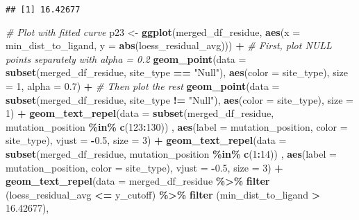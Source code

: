 \documentclass[
]{article}
\newenvironment{Shaded}{\begin{snugshade}}{\end{snugshade}}
\newcommand{\AttributeTok}[1]{\textcolor[rgb]{0.13,0.29,0.53}{#1}}
\newcommand{\CommentTok}[1]{\textcolor[rgb]{0.56,0.35,0.01}{\textit{#1}}}
\newcommand{\DecValTok}[1]{\textcolor[rgb]{0.00,0.00,0.81}{#1}}
\newcommand{\FloatTok}[1]{\textcolor[rgb]{0.00,0.00,0.81}{#1}}
\newcommand{\FunctionTok}[1]{\textcolor[rgb]{0.13,0.29,0.53}{\textbf{#1}}}
\newcommand{\NormalTok}[1]{#1}
\newcommand{\OtherTok}[1]{\textcolor[rgb]{0.56,0.35,0.01}{#1}}
\newcommand{\SpecialCharTok}[1]{\textcolor[rgb]{0.81,0.36,0.00}{\textbf{#1}}}
\newcommand{\StringTok}[1]{\textcolor[rgb]{0.31,0.60,0.02}{#1}}
\begin{document}
\begin{verbatim}
## [1] 16.42677
\end{verbatim}

\begin{Shaded}
\begin{Highlighting}[]
\CommentTok{\# Plot with fitted curve}
\NormalTok{p23 }\OtherTok{\textless{}{-}} \FunctionTok{ggplot}\NormalTok{(merged\_df\_residue, }\FunctionTok{aes}\NormalTok{(}\AttributeTok{x =}\NormalTok{ min\_dist\_to\_ligand, }\AttributeTok{y =} \FunctionTok{abs}\NormalTok{(loess\_residual\_avg))) }\SpecialCharTok{+}
  \CommentTok{\# First, plot NULL points separately with alpha = 0.2}
  \FunctionTok{geom\_point}\NormalTok{(}\AttributeTok{data =} \FunctionTok{subset}\NormalTok{(merged\_df\_residue, site\_type }\SpecialCharTok{==} \StringTok{"Null"}\NormalTok{),}
             \FunctionTok{aes}\NormalTok{(}\AttributeTok{color =}\NormalTok{ site\_type), }\AttributeTok{size =} \DecValTok{1}\NormalTok{, }\AttributeTok{alpha =} \FloatTok{0.7}\NormalTok{) }\SpecialCharTok{+}
  \CommentTok{\# Then plot the rest}
  \FunctionTok{geom\_point}\NormalTok{(}\AttributeTok{data =} \FunctionTok{subset}\NormalTok{(merged\_df\_residue, site\_type }\SpecialCharTok{!=} \StringTok{"Null"}\NormalTok{),}
             \FunctionTok{aes}\NormalTok{(}\AttributeTok{color =}\NormalTok{ site\_type), }\AttributeTok{size =} \DecValTok{1}\NormalTok{) }\SpecialCharTok{+}
  \FunctionTok{geom\_text\_repel}\NormalTok{(}\AttributeTok{data =} \FunctionTok{subset}\NormalTok{(merged\_df\_residue, mutation\_position }\SpecialCharTok{\%in\%} \FunctionTok{c}\NormalTok{(}\DecValTok{123}\SpecialCharTok{:}\DecValTok{130}\NormalTok{)) ,}
                  \FunctionTok{aes}\NormalTok{(}\AttributeTok{label =}\NormalTok{ mutation\_position, }\AttributeTok{color =}\NormalTok{ site\_type), }\AttributeTok{vjust =} \SpecialCharTok{{-}}\FloatTok{0.5}\NormalTok{, }\AttributeTok{size =} \DecValTok{3}\NormalTok{) }\SpecialCharTok{+}
    \FunctionTok{geom\_text\_repel}\NormalTok{(}\AttributeTok{data =} \FunctionTok{subset}\NormalTok{(merged\_df\_residue, mutation\_position }\SpecialCharTok{\%in\%} \FunctionTok{c}\NormalTok{(}\DecValTok{1}\SpecialCharTok{:}\DecValTok{14}\NormalTok{)) ,}
                  \FunctionTok{aes}\NormalTok{(}\AttributeTok{label =}\NormalTok{ mutation\_position, }\AttributeTok{color =}\NormalTok{ site\_type), }\AttributeTok{vjust =} \SpecialCharTok{{-}}\FloatTok{0.5}\NormalTok{, }\AttributeTok{size =} \DecValTok{3}\NormalTok{) }\SpecialCharTok{+}
  \FunctionTok{geom\_text\_repel}\NormalTok{(}\AttributeTok{data =}\NormalTok{ merged\_df\_residue }\SpecialCharTok{\%\textgreater{}\%} \FunctionTok{filter}\NormalTok{ (loess\_residual\_avg }\SpecialCharTok{\textless{}=}\NormalTok{ y\_cutoff) }\SpecialCharTok{\%\textgreater{}\%} \FunctionTok{filter}\NormalTok{ (min\_dist\_to\_ligand }\SpecialCharTok{\textgreater{}} \FloatTok{16.42677}\NormalTok{),}

\end{Highlighting}
\end{Shaded}
\end{document}
